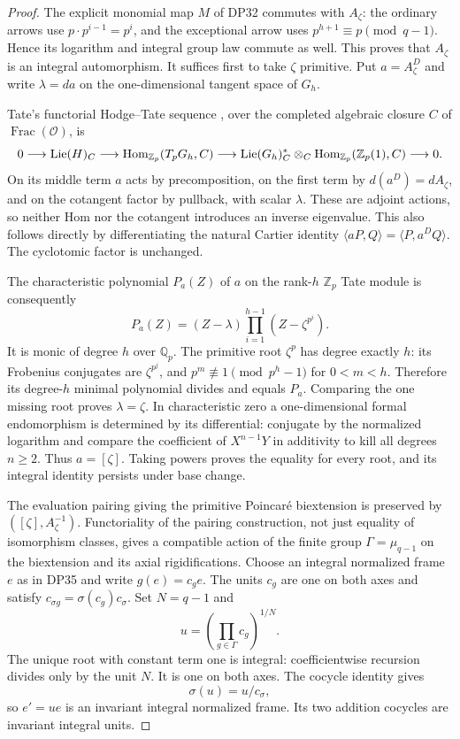 \documentclass[11pt,a4paper]{article}
\theoremstyle{definition}\newtheorem{remark}[theorem]{Remark}
\newcommand{\Z}{\mathbb Z}\newcommand{\Q}{\mathbb Q}\newcommand{\F}{\mathbb F}
\newcommand{\Lie}{\operatorname{Lie}}\newcommand{\Dist}{\operatorname{Dist}}
\begin{document}
\begin{proof}
The explicit monomial map $M$ of DP32 commutes with $A_\zeta$: the ordinary arrows use $p\cdot p^{i-1}=p^i$, and the exceptional arrow uses $p^{h+1}\equiv p\pmod{q-1}$. Hence its logarithm and integral group law commute as well. This proves that $A_\zeta$ is an integral automorphism. It suffices first to take $\zeta$ primitive. Put $a=A_\zeta^D$ and write $\lambda=da$ on the one-dimensional tangent space of $G_h$.

Tate's functorial Hodge--Tate sequence \cite[\S4, Corollary 2 following Theorem 3, p.~180]{Tate67}, over the completed algebraic closure $C$ of $\operatorname{Frac}(\mathcal O)$, is
\[
 0\longrightarrow \Lie(H)_C
 \longrightarrow \Hom_{\Z_p}(T_pG_h,C)
 \longrightarrow \Lie(G_h)_C^*\otimes_C\Hom_{\Z_p}(\Z_p(1),C)
 \longrightarrow0.
\]
On its middle term $a$ acts by precomposition, on the first term by $d(a^D)=dA_\zeta$, and on the cotangent factor by pullback, with scalar $\lambda$. These are adjoint actions, so neither Hom nor the cotangent introduces an inverse eigenvalue. This also follows directly by differentiating the natural Cartier identity $\langle aP,Q\rangle=\langle P,a^DQ\rangle$. The cyclotomic factor is unchanged.

The characteristic polynomial $P_a(Z)$ of $a$ on the rank-$h$ $\Z_p$ Tate module is consequently
\[
 P_a(Z)=(Z-\lambda)\prod_{i=1}^{h-1}(Z-\zeta^{p^i}).
\]
It is monic of degree $h$ over $\Q_p$. The primitive root $\zeta^p$ has degree exactly $h$: its Frobenius conjugates are $\zeta^{p^j}$, and $p^m\not\equiv1\pmod{p^h-1}$ for $0<m<h$. Therefore its degree-$h$ minimal polynomial divides and equals $P_a$. Comparing the one missing root proves $\lambda=\zeta$. In characteristic zero a one-dimensional formal endomorphism is determined by its differential: conjugate by the normalized logarithm and compare the coefficient of $X^{n-1}Y$ in additivity to kill all degrees $n\ge2$. Thus $a=[\zeta]$. Taking powers proves the equality for every root, and its integral identity persists under base change.

The evaluation pairing giving the primitive Poincar\'e biextension is preserved by $([\zeta],A_\zeta^{-1})$. Functoriality of the pairing construction, not just equality of isomorphism classes, gives a compatible action of the finite group $\Gamma=\mu_{q-1}$ on the biextension and its axial rigidifications. Choose an integral normalized frame $e$ as in DP35 and write $g(e)=c_g e$. The units $c_g$ are one on both axes and satisfy $c_{\sigma g}=\sigma(c_g)c_\sigma$. Set $N=q-1$ and
\[
 u=\left(\prod_{g\in\Gamma}c_g\right)^{1/N}.
\]
The unique root with constant term one is integral: coefficientwise recursion divides only by the unit $N$. It is one on both axes. The cocycle identity gives
\[
 \sigma(u)=u/c_\sigma,
\]
so $e'=ue$ is an invariant integral normalized frame. Its two addition cocycles are invariant integral units.


\end{proof}
\end{document}
